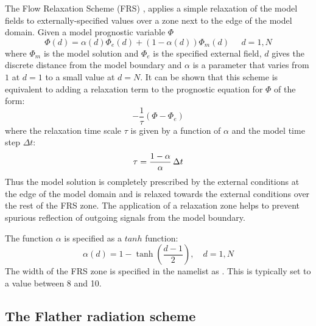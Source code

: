 \documentclass[NEMO_book]{subfiles}
\begin{document}
The Flow Relaxation Scheme (FRS) \citep{Davies_QJRMS76,Engerdahl_Tel95},
applies a simple relaxation of the model fields to
externally-specified values over a zone next to the edge of the model
domain. Given a model prognostic variable $\Phi$ 
\begin{equation}  \label{Eq_bdy_frs1}
\Phi(d) = \alpha(d)\Phi_{e}(d) + (1-\alpha(d))\Phi_{m}(d)\;\;\;\;\; d=1,N
\end{equation}
where $\Phi_{m}$ is the model solution and $\Phi_{e}$ is the specified
external field, $d$ gives the discrete distance from the model
boundary  and $\alpha$ is a parameter that varies from $1$ at $d=1$ to
a small value at $d=N$. It can be shown that this scheme is equivalent
to adding a relaxation term to the prognostic equation for $\Phi$ of
the form:
\begin{equation}  \label{Eq_bdy_frs2}
-\frac{1}{\tau}\left(\Phi - \Phi_{e}\right)
\end{equation}
where the relaxation time scale $\tau$ is given by a function of
$\alpha$ and the model time step $\Delta t$:
\begin{equation}  \label{Eq_bdy_frs3}
\tau = \frac{1-\alpha}{\alpha}  \,\Delta t
\end{equation}
Thus the model solution is completely prescribed by the external
conditions at the edge of the model domain and is relaxed towards the
external conditions over the rest of the FRS zone. The application of
a relaxation zone helps to prevent spurious reflection of outgoing
signals from the model boundary. 

The function $\alpha$ is specified as a $tanh$ function:
\begin{equation}  \label{Eq_bdy_frs4}
\alpha(d) = 1 - \tanh\left(\frac{d-1}{2}\right),       \quad d=1,N
\end{equation}
The width of the FRS zone is specified in the namelist as 
. This is typically set to a value between 8 and 10. 

\subsection{The Flather radiation scheme}
\label{BDY_flather_scheme}
\end{document}
